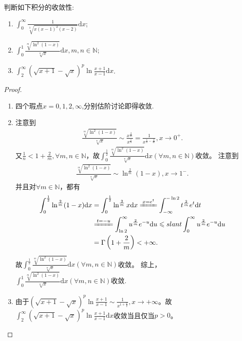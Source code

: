 \documentclass[../../main.tex]{subfiles}
\begin{document}
\begin{example}
判断如下积分的收敛性:
\begin{enumerate}
\item  \(\int_{0}^{\infty}\frac{1}{\sqrt[3]{x(x - 1)^2(x - 2)}}\mathrm{d}x\);

\item \(\int_{0}^{1}\frac{\sqrt[m]{\ln^2(1 - x)}}{\sqrt[n]{x}}\mathrm{d}x, m,n\in\mathbb{N}\);

\item \(\int_{2}^{\infty}(\sqrt{x + 1}-\sqrt{x})^p\ln\frac{x + 1}{x - 1}\mathrm{d}x\).
\end{enumerate}
\end{example}
\begin{proof}
\begin{enumerate}
\item 四个瑕点$x=0,1,2,\infty$,分别估阶讨论即得收敛.

\item 注意到
\begin{align*}
\frac{\sqrt[m]{\ln ^2(1 - x)}}{\sqrt[n]{x}}\sim\frac{x^{\frac{2}{m}}}{x^{\frac{1}{n}}}=\frac{1}{x^{\frac{1}{n}-\frac{2}{m}}},x\rightarrow 0^+.
\end{align*}
又\(\frac{1}{n}<1+\frac{2}{m},\forall m,n\in \mathbb{N}\)，故\(\int_{0}^{\frac{1}{2}}\frac{\sqrt[m]{\ln ^2(1 - x)}}{\sqrt[n]{x}}\mathrm{d}x\left( \forall m,n\in \mathbb{N} \right)\)收敛。
注意到
\begin{align*}
\frac{\sqrt[m]{\ln ^2(1 - x)}}{\sqrt[n]{x}}\sim\ln ^{\frac{2}{m}}(1 - x),x\rightarrow 1^-.
\end{align*}
并且对\(\forall m\in \mathbb{N}\)，都有
\begin{align*}
\int_0^{\frac{1}{2}}{\ln ^{\frac{2}{m}}(1}-x)\mathrm{d}x&=\int_0^{\frac{1}{2}}{\ln ^{\frac{2}{m}}x\mathrm{d}x\xlongequal{x=e^t}\int_{-\infty}^{-\ln 2}{t^{\frac{2}{m}}e^t\mathrm{d}t}}
\\
&\xlongequal{t=-u}\int_{\ln 2}^{\infty}{u^{\frac{2}{m}}e^{-u}\mathrm{d}u}\leqslant slant \int_0^{\infty}{u^{\frac{2}{m}}e^{-u}\mathrm{d}u}
\\
&=\Gamma \left( 1+\frac{2}{m} \right) <+\infty .
\end{align*}
故\(\int_{0}^{\frac{1}{2}}\frac{\sqrt[m]{\ln ^2(1 - x)}}{\sqrt[n]{x}}\mathrm{d}x\left( \forall m,n\in \mathbb{N} \right)\)收敛。
综上，\(\int_{0}^{1}\frac{\sqrt[m]{\ln ^2(1 - x)}}{\sqrt[n]{x}}\mathrm{d}x\left( \forall m,n\in \mathbb{N} \right)\)收敛.

\item 由于\((\sqrt{x + 1} - \sqrt{x})^p\ln\frac{x + 1}{x - 1}\sim\frac{1}{x^{1+\frac{p}{2}}},x\rightarrow +\infty\)。故\(\int_{2}^{\infty}(\sqrt{x + 1} - \sqrt{x})^p\ln\frac{x + 1}{x - 1} \mathrm{d}x\)收敛当且仅当\(p > 0\)。 
\end{enumerate}
\end{proof}
\end{document}
